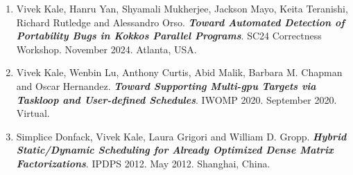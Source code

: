 
\begin{enumerate}
\item Vivek Kale, Hanru Yan, Shyamali Mukherjee, Jackson Mayo, Keita Teranishi, Richard Rutledge and Alessandro Orso. \textbf{\textit{Toward Automated Detection of Portability Bugs in Kokkos Parallel Programs}}. SC24 Correctness Workshop. November 2024. Atlanta, USA.

\item Vivek Kale, Wenbin Lu, Anthony Curtis, Abid Malik, Barbara M. Chapman and Oscar Hernandez. \textbf{\textit {Toward Supporting Multi-gpu Targets via Taskloop and User-defined Schedules}}. IWOMP 2020. September 2020. Virtual. 

\item Simplice Donfack, Vivek Kale, Laura Grigori and William D. Gropp. \textbf{\textit{Hybrid Static/Dynamic Scheduling for Already Optimized Dense Matrix Factorizations}}. IPDPS 2012. May 2012. Shanghai, China.

\end{enumerate} 
